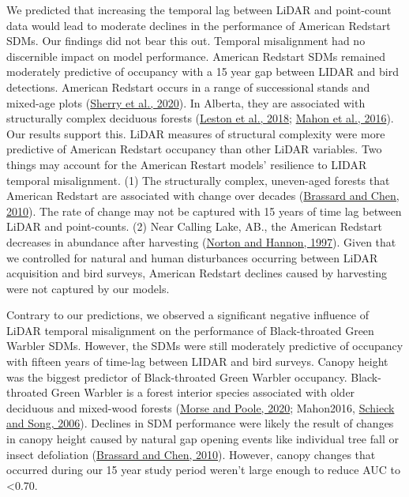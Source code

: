 \documentclass[
  12pt,
]{article}
\begin{document}
We predicted that increasing the temporal lag between LiDAR and point-count data would lead to moderate declines in the performance of American Redstart SDMs. Our findings did not bear this out. Temporal misalignment had no discernible impact on model performance. American Redstart SDMs remained moderately predictive of occupancy with a 15 year gap between LIDAR and bird detections. American Redstart occurs in a range of successional stands and mixed-age plots (\protect\hyperlink{ref-sherryAmericanRedstartSetophaga2020a}{Sherry et al., 2020}). In Alberta, they are associated with structurally complex deciduous forests (\protect\hyperlink{ref-lestonLongtermChangesBoreal2018}{Leston et al., 2018}; \protect\hyperlink{ref-Mahon2016}{Mahon et al., 2016}). Our results support this. LiDAR measures of structural complexity were more predictive of American Redstart occupancy than other LiDAR variables. Two things may account for the American Restart models' resilience to LIDAR temporal misalignment. (1) The structurally complex, uneven-aged forests that American Redstart are associated with change over decades (\protect\hyperlink{ref-brassardStandStructureComposition2010}{Brassard and Chen, 2010}). The rate of change may not be captured with 15 years of time lag between LiDAR and point-counts. (2) Near Calling Lake, AB., the American Redstart decreases in abundance after harvesting (\protect\hyperlink{ref-nortonSongbirdResponsePartialcut1997}{Norton and Hannon, 1997}). Given that we controlled for natural and human disturbances occurring between LiDAR acquisition and bird surveys, American Redstart declines caused by harvesting were not captured by our models.

Contrary to our predictions, we observed a significant negative influence of LiDAR temporal misalignment on the performance of Black-throated Green Warbler SDMs. However, the SDMs were still moderately predictive of occupancy with fifteen years of time-lag between LIDAR and bird surveys. Canopy height was the biggest predictor of Black-throated Green Warbler occupancy. Black-throated Green Warbler is a forest interior species associated with older deciduous and mixed-wood forests (\protect\hyperlink{ref-morseBlackthroatedGreenWarbler2020a}{Morse and Poole, 2020}; Mahon2016, \protect\hyperlink{ref-Schieck2006}{Schieck and Song, 2006}). Declines in SDM performance were likely the result of changes in canopy height caused by natural gap opening events like individual tree fall or insect defoliation (\protect\hyperlink{ref-brassardStandStructureComposition2010}{Brassard and Chen, 2010}). However, canopy changes that occurred during our 15 year study period weren't large enough to reduce AUC to \textless0.70.
\end{document}
